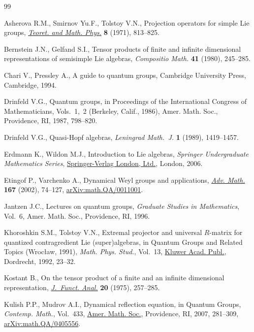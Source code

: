 \documentclass[pdftex]{sigma}
\numberwithin{equation}{section}
\begin{document}
\begin{thebibliography}{99}
\footnotesize\itemsep=0pt

Asherova R.M., Smirnov Yu.F., Tolstoy V.N., Projection operators for simple
 {L}ie groups, \href{https://doi.org/10.1007/BF01038003}{\textit{Teoret. and Math. Phys.}} \textbf{8} (1971), 813--825.

Bernstein J.N., Gelfand S.I., Tensor products of finite and infinite
 dimensional representations of semisimple {L}ie algebras, \textit{Compositio
 Math.} \textbf{41} (1980), 245--285.

Chari V., Pressley A., A guide to quantum groups, Cambridge University Press,
 Cambridge, 1994.

Drinfeld V.G., Quantum groups, in Proceedings of the {I}nternational {C}ongress
 of {M}athematicians, {V}ols.~1,~2 ({B}erkeley, {C}alif., 1986), Amer. Math.
 Soc., Providence, RI, 1987, 798--820.

Drinfeld V.G., Quasi-{H}opf algebras, \textit{Leningrad Math.~J.} \textbf{1}
 (1989), 1419--1457.

Erdmann K., Wildon M.J., Introduction to {L}ie algebras, \textit{Springer Undergraduate
 Mathematics Series}, \href{https://doi.org/10.1007/1-84628-490-2}{Springer-Verlag London, Ltd.}, London, 2006.

Etingof P., Varchenko A., Dynamical {W}eyl groups and applications,
 \href{https://doi.org/10.1006/aima.2001.2034}{\textit{Adv. Math.}} \textbf{167} (2002), 74--127, \href{https://arxiv.org/abs/math.QA/0011001}{arXiv:math.QA/0011001}.

Jantzen J.C., Lectures on quantum groups, \textit{Graduate Studies in
 Mathematics}, Vol.~6, Amer. Math. Soc., Providence, RI, 1996.

Khoroshkin S.M., Tolstoy V.N., Extremal projector and universal {$R$}-matrix
 for quantized contragredient {L}ie (super)algebras, in Quantum Groups and
 Related Topics ({W}roc{\l}aw, 1991), \textit{Math. Phys. Stud.}, Vol.~13,
 \href{https://doi.org/10.1007/978-94-011-2801-8_3}{Kluwer Acad. Publ.}, Dordrecht, 1992, 23--32.

Kostant B., On the tensor product of a finite and an infinite dimensional
 representation, \href{https://doi.org/10.1016/0022-1236(75)90035-x}{\textit{J.~Funct. Anal.}} \textbf{20} (1975), 257--285.

Kulish P.P., Mudrov A.I., Dynamical reflection equation, in Quantum Groups,
 \textit{Contemp. Math.}, Vol.~433, \href{https://doi.org/10.1090/conm/433/08331}{Amer. Math. Soc.}, Providence, RI, 2007,
 281--309, \href{https://arxiv.org/abs/math.QA/0405556}{arXiv:math.QA/0405556}.


\end{thebibliography}
\end{document}

